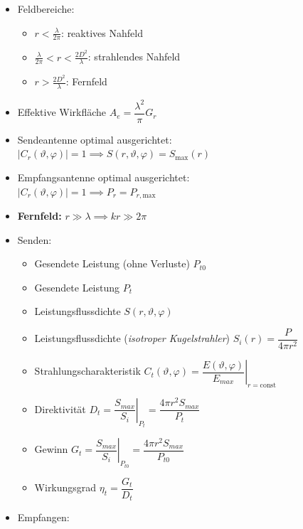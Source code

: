 \begin{itemize}
    \itemsep0pt
    \item Feldbereiche:
        \begin{itemize}
            \itemsep0pt
            \item \(r < \frac{\lambda}{2\pi}\): reaktives Nahfeld
            \item \(\frac{\lambda}{2\pi} < r < \frac{2D^2}{\lambda}\): strahlendes Nahfeld
            \item \(r > \frac{2D^2}{\lambda}\): Fernfeld
        \end{itemize}
    \item Effektive Wirkfläche \(A_e = \dfrac{\lambda^2}{\pi} G_r\)
    \item Sendeantenne optimal ausgerichtet:\\
        \(\left|C_r(\vartheta, \varphi)\right| = 1 \implies S(r,\vartheta,\varphi) = S_{\mathrm{max}}(r)\)
    \item Empfangsantenne optimal ausgerichtet:\\
        \(\left|C_r(\vartheta, \varphi)\right| = 1 \implies P_r = P_{r, \mathrm{max}}\)
    \item \textbf{Fernfeld:} \(r \gg \lambda \implies kr \gg 2\pi\)
    \item Senden:
        \begin{itemize}
            \itemsep0pt
            \item Gesendete Leistung (ohne Verluste) \(P_{t0}\)
            \item Gesendete Leistung \(P_t\)
            \item Leistungsflussdichte \(S(r, \vartheta, \varphi)\)
            \item Leistungsflussdichte (\textit{isotroper Kugelstrahler}) \(S_i(r) = \dfrac{P}{4\pi r^2}\)
            \item Strahlungscharakteristik \(C_t(\vartheta, \varphi) = \left.\dfrac{E(\vartheta, \varphi)}{E_{max}}\right|_{r = \mathrm{const}}\)
            \item Direktivität \(\left.D_t = \dfrac{S_{max}}{S_i}\right|_{P_t} = \dfrac{4\pi r^2 S_{max}}{P_{t}}\)
            \item Gewinn \(\left.G_t = \dfrac{S_{max}}{S_i}\right|_{P_{t0}} = \dfrac{4\pi r^2 S_{max}}{P_{t0}}\)
            \item Wirkungsgrad \(\eta_t = \dfrac{G_t}{D_t}\)
        \end{itemize}
    \item Empfangen:
        \begin{itemize}

\end{itemize}
\end{itemize}
